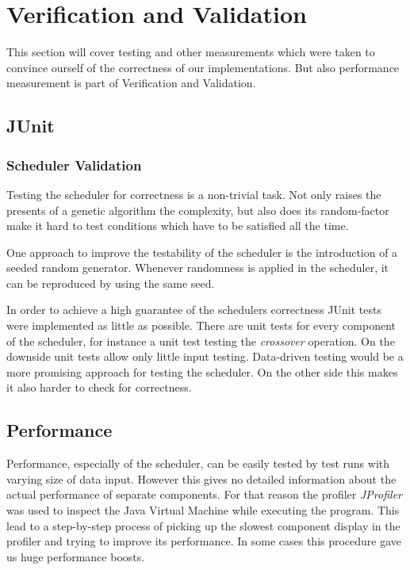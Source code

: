 \section{Verification and Validation}

This section will cover testing and other measurements which were taken to convince ourself of the correctness of our implementations. But also performance measurement is part of Verification and Validation.

\subsection{JUnit}

\subsubsection{Scheduler Validation}

Testing the scheduler for correctness is a non-trivial task. Not only raises the presents of a genetic algorithm the complexity, but also does its random-factor make it hard to test conditions which have to be satisfied all the time.

One approach to improve the testability of the scheduler is the introduction of a seeded random generator. Whenever randomness is applied in the scheduler, it can be reproduced by using the same seed.

In order to achieve a high guarantee of the schedulers correctness JUnit tests were implemented as little as possible. There are unit tests for every component of the scheduler, for instance a unit test testing the \emph{crossover} operation. On the downside unit tests allow only little input testing. Data-driven testing would be a more promising approach for testing the scheduler. On the other side this makes it also harder to check for correctness.

\subsection{Performance}

Performance, especially of the scheduler, can be easily tested by test runs with varying size of data input. However this gives no detailed information about the actual performance of separate components. For that reason the profiler \emph{JProfiler} was used to inspect the Java Virtual Machine while executing the program. This lead to a step-by-step process of picking up the slowest component display in the profiler and trying to improve its performance. In some cases this procedure gave us huge performance boosts.